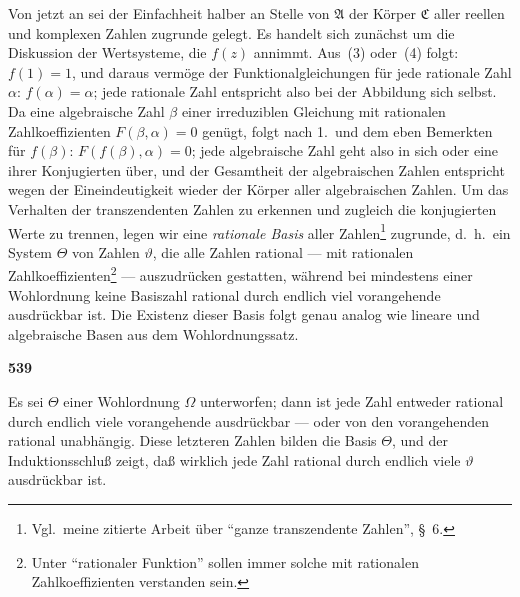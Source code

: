 \documentclass[12pt,a4paper]{article}
\begin{document}
Von jetzt an sei der Einfachheit halber an Stelle von $\mathfrak{A}$ der K\"orper $\mathfrak{C}$ aller reellen und komplexen Zahlen zugrunde gelegt. Es handelt sich zun\"achst um die Diskussion der Wertsysteme, die $f(z)$ annimmt. Aus~(3) oder~(4) folgt: $f(1) = 1$, und daraus verm\"oge der Funktionalgleichungen f\"ur jede rationale Zahl $\alpha$: $f(\alpha) = \alpha$; jede rationale Zahl entspricht also bei der Abbildung sich selbst. Da eine algebraische Zahl $\beta$ einer irreduziblen Gleichung mit rationalen Zahlkoeffizienten $F(\beta, \alpha) = 0$ gen\"ugt, folgt nach 1.\ und dem eben Bemerkten f\"ur $f(\beta)$: $F(f(\beta), \alpha) = 0$; jede algebraische Zahl geht also in sich oder eine ihrer Konjugierten \"uber, und der Gesamtheit der algebraischen Zahlen entspricht wegen der Eineindeutigkeit wieder der K\"orper aller algebraischen Zahlen. Um das Verhalten der transzendenten Zahlen zu erkennen und zugleich die konjugierten Werte zu trennen, legen wir eine \emph{rationale Basis} aller Zahlen\footnote{Vgl.\ meine zitierte Arbeit \"uber ``ganze transzendente Zahlen'', \S\ 6.} zugrunde, d.\ h.\ ein System $\Theta$ von Zahlen $\vartheta$, die alle Zahlen rational --- mit rationalen Zahlkoeffizienten\footnote{Unter ``rationaler Funktion'' sollen immer solche mit rationalen Zahlkoeffizienten verstanden sein.} --- auszudr\"ucken gestatten, w\"ahrend bei mindestens einer Wohlordnung keine Basiszahl rational durch endlich viel vorangehende ausdr\"uckbar ist. Die Existenz dieser Basis folgt genau analog wie lineare und algebraische Basen aus dem Wohlordnungssatz.

\newpage
\begin{center}
\textbf{539}
\end{center}

Es sei $\Theta$ einer Wohlordnung $\Omega$ unterworfen; dann ist jede Zahl entweder rational durch endlich viele vorangehende ausdr\"uckbar --- oder von den vorangehenden rational unabh\"angig. Diese letzteren Zahlen bilden die Basis $\Theta$, und der Induktionsschlu\ss{} zeigt, da\ss{} wirklich jede Zahl rational durch endlich viele $\vartheta$ ausdr\"uckbar ist.
\end{document}
